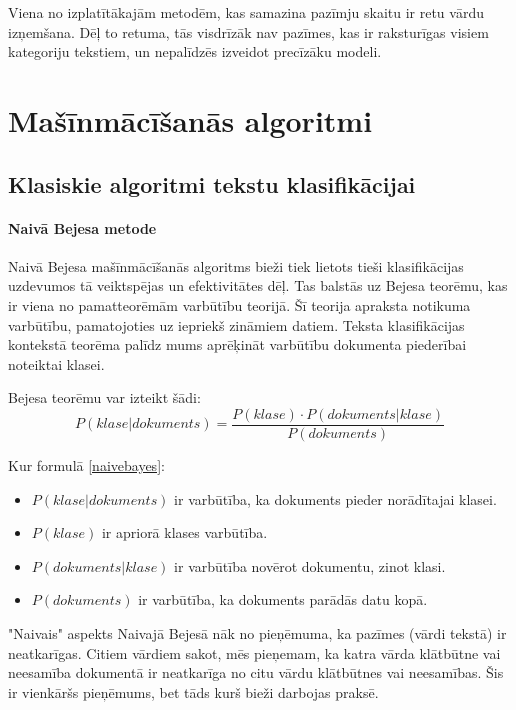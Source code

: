 Viena no izplatītākajām metodēm, kas samazina pazīmju skaitu ir retu vārdu izņemšana. Dēļ to retuma, tās visdrīzāk nav pazīmes, kas ir raksturīgas visiem kategoriju tekstiem, un nepalīdzēs izveidot precīzāku modeli.

\chapter{Mašīnmācīšanās algoritmi}

\section{Klasiskie algoritmi tekstu klasifikācijai}

\subsubsection{Naivā Bejesa metode}
Naivā Bejesa  mašīnmācīšanās algoritms bieži tiek lietots tieši klasifikācijas uzdevumos tā veiktspējas un efektivitātes dēļ.  Tas balstās uz Bejesa teorēmu, kas ir viena no pamatteorēmām varbūtību teorijā. Šī teorija apraksta notikuma varbūtību, pamatojoties uz iepriekš zināmiem datiem. Teksta klasifikācijas kontekstā teorēma palīdz mums aprēķināt varbūtību dokumenta piederībai noteiktai klasei.

Bejesa teorēmu var izteikt šādi:
\begin{equation} \label{naivebayes}
   P(klase|dokuments) = \frac{P(klase) \cdot P(dokuments|klase)}{P(dokuments)}
\end{equation}

 Kur formulā \ref{naivebayes}:
\begin{itemize}
\item \(P(klase|dokuments)\) ir varbūtība, ka dokuments pieder norādītajai klasei.
\item \(P(klase)\) ir apriorā klases varbūtība.
\item \(P(dokuments|klase)\) ir varbūtība novērot dokumentu, zinot klasi.
\item \(P(dokuments)\) ir varbūtība, ka dokuments parādās datu kopā.
\end{itemize}

"Naivais" aspekts Naivajā Bejesā nāk no pieņēmuma, ka pazīmes (vārdi tekstā) ir neatkarīgas. Citiem vārdiem sakot, mēs pieņemam, ka katra vārda klātbūtne vai neesamība dokumentā ir neatkarīga no citu vārdu klātbūtnes vai neesamības. Šis ir vienkāršs pieņēmums, bet tāds kurš bieži darbojas praksē.

